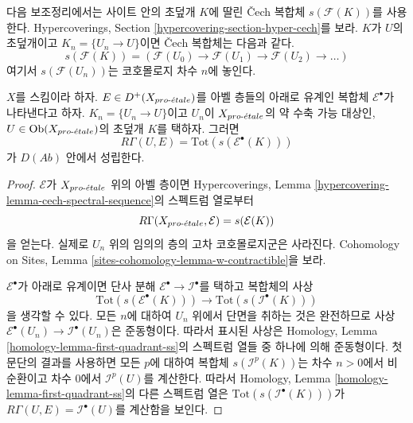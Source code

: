 \noindent
다음 보조정리에서는 사이트 안의 초덮개 $K$에 딸린 \v{C}ech 복합체
$s(\mathcal{F}(K))$를 사용한다. Hypercoverings, Section
\ref{hypercovering-section-hyper-cech}를 보라. $K$가 $U$의 초덮개이고
$K_n = \{U_n \to U\}$이면 \v{C}ech 복합체는 다음과 같다.
$$
s(\mathcal{F}(K)) =
\left(
\mathcal{F}(U_0) \to \mathcal{F}(U_1) \to \mathcal{F}(U_2) \to \ldots
\right)
$$
여기서 $s(\mathcal{F}(U_n))$는 코호몰로지 차수 $n$에 놓인다.

\begin{lemma}
\label{lemma-compute-cohomology}
$X$를 스킴이라 하자. $E \in D^+(X_{pro\text{-}\acute{e}tale})$를 아벨 층들의 아래로
유계인 복합체 $\mathcal{E}^\bullet$가 나타낸다고 하자.
$K_n = \{U_n \to U\}$이고 $U_n$이 $X_{pro\text{-}\acute{e}tale}$의 약 수축 가능
대상인, $U \in \mathop{\mathrm{Ob}}\nolimits(X_{pro\text{-}\acute{e}tale})$의 초덮개 $K$를 택하자. 그러면
$$
R\Gamma(U, E) = \text{Tot}(s(\mathcal{E}^\bullet(K)))
$$
가 $D(\textit{Ab})$ 안에서 성립한다.
\end{lemma}

\begin{proof}
$\mathcal{E}$가 $X_{pro\text{-}\acute{e}tale}$ 위의 아벨 층이면 Hypercoverings, Lemma
\ref{hypercovering-lemma-cech-spectral-sequence}의 스펙트럼 열로부터
$$
R\Gamma(X_{pro\text{-}\acute{e}tale}, \mathcal{E}) = s(\mathcal{E}(K))
$$
을 얻는다. 실제로 $U_n$ 위의 임의의 층의 고차 코호몰로지군은
사라진다. Cohomology on Sites, Lemma
\ref{sites-cohomology-lemma-w-contractible}을 보라.

\medskip\noindent
$\mathcal{E}^\bullet$가 아래로 유계이면 단사 분해
$\mathcal{E}^\bullet \to \mathcal{I}^\bullet$를 택하고 복합체의 사상
$$
\text{Tot}(s(\mathcal{E}^\bullet(K)))
\longrightarrow
\text{Tot}(s(\mathcal{I}^\bullet(K)))
$$
을 생각할 수 있다. 모든 $n$에 대하여 $U_n$ 위에서 단면을 취하는
것은 완전하므로 사상
$\mathcal{E}^\bullet(U_n) \to \mathcal{I}^\bullet(U_n)$은 준동형이다.
따라서 표시된 사상은 Homology, Lemma
\ref{homology-lemma-first-quadrant-ss}의 스펙트럼 열들 중 하나에 의해
준동형이다. 첫 문단의 결과를 사용하면 모든 $p$에 대하여 복합체
$s(\mathcal{I}^p(K))$는 차수 $n > 0$에서 비순환이고 차수 $0$에서
$\mathcal{I}^p(U)$를 계산한다. 따라서 Homology, Lemma
\ref{homology-lemma-first-quadrant-ss}의 다른 스펙트럼 열은
$\text{Tot}(s(\mathcal{I}^\bullet(K)))$가
$R\Gamma(U, E) = \mathcal{I}^\bullet(U)$를 계산함을 보인다.
\end{proof}

